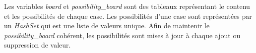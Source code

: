 \documentclass[a4paper]{article}
\begin{document}
\begin{minipage}{\textwidth}
\captionsetup{hypcap=false}
\end{minipage}

\begin{justify}
    Les variables \textit{board} et \textit{possibility\_board} sont des tableaux représentant le contenu et les possibilités de chaque case. Les possibilités d'une case sont représentées par un \textit{HashSet} qui est une liste de valeurs unique. Afin de maintenir le \textit{possibility\_board} cohérent, les possibilités sont mises à jour à chaque ajout ou suppression de valeur.
\end{justify}

\newpage
\end{document}
